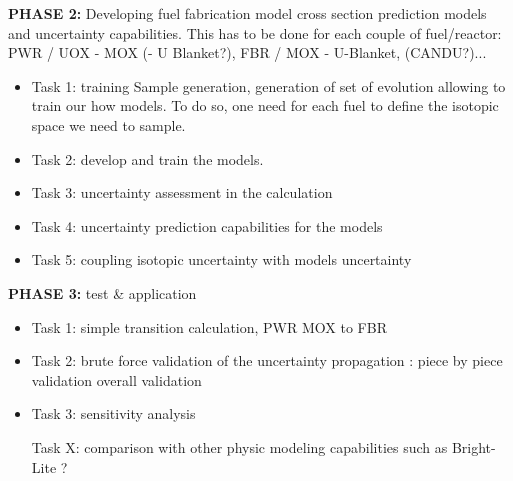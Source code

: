 \documentclass[dvips,12pt]{article}
\begin{document}
\textbf{PHASE 2:} Developing fuel fabrication model cross section prediction models and uncertainty capabilities. This has to be done for each couple of fuel/reactor: PWR / UOX - MOX (- U Blanket?), FBR / MOX - U-Blanket, (CANDU?)...
\begin{itemize}
\item Task 1: training Sample generation, generation of set of evolution allowing to train our how models.
To do so, one need for each fuel to define the isotopic space we need to sample. 
\item Task 2: develop and train the models.
\item Task 3: uncertainty assessment in the calculation
\item Task 4: uncertainty prediction capabilities for the models
\item Task 5: coupling isotopic uncertainty with models uncertainty
\end{itemize}
 
\textbf{PHASE 3:} test \& application
\begin{itemize}
\item Task 1: simple transition calculation, PWR MOX to FBR
\item Task 2: brute force validation of the uncertainty propagation :
piece by piece validation
overall validation
\item Task 3: sensitivity analysis

Task X: comparison with other physic modeling capabilities such as Bright-Lite ?
\end{itemize}
 












\end{document}
